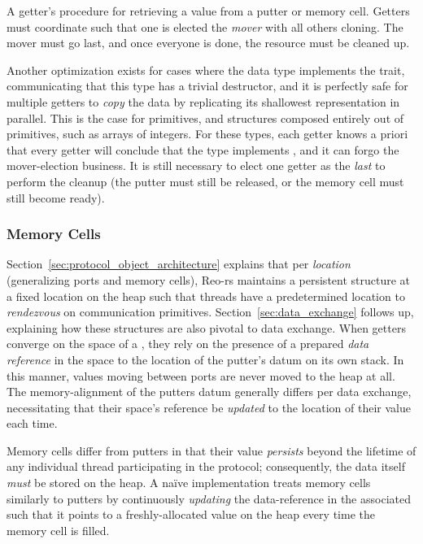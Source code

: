 \begin{listing}[ht]
	\centering
	\inputminted{rust}{get_data.rs}
	\caption[Getter procedure for acquiring resource data.]{A getter's procedure for retrieving a value from a putter or memory cell. Getters must coordinate such that one is elected the \textit{mover} with all others cloning. The mover must go last, and once everyone is done, the resource must be cleaned up.}
	\label{listing:get_data}
\end{listing}


Another optimization exists for cases where the data type implements the  trait, communicating that this type has a trivial destructor, and it is perfectly safe for multiple getters to \textit{copy} the data by replicating its shallowest representation in parallel. This is the case for primitives, and structures composed entirely out of primitives, such as arrays of integers. For these types, each getter knows a priori that every getter will conclude that the type implements , and it can forgo the mover-election business. It is still necessary to elect one getter as the \textit{last} to perform the cleanup (the putter must still be released, or the memory cell must still become ready).



\subsubsection{Memory Cells}
\label{sec:memory_cells}
Section~\ref{sec:protocol_object_architecture} explains that per \textit{location} (generalizing ports and memory cells), Reo-rs maintains a persistent  structure at a fixed location on the heap such that threads have a predetermined location to \textit{rendezvous} on communication primitives. Section~\ref{sec:data_exchange} follows up, explaining how these structures are also pivotal to data exchange. When getters converge on the space of a , they rely on the presence of a prepared \textit{data reference} in the space to the location of the putter's datum on its own stack. In this manner, values moving between ports are never moved to the heap at all. The memory-alignment of the putters datum generally differs per data exchange, necessitating that their space's reference be \textit{updated} to the location of their value each time. 

Memory cells differ from putters in that their value \textit{persists} beyond the lifetime of any individual thread participating in the protocol; consequently, the data itself \textit{must} be stored on the heap. A na\"ive implementation treats memory cells similarly to putters by continuously \textit{updating} the data-reference in the associated  such that it points to a freshly-allocated value on the heap every time the memory cell is filled.

